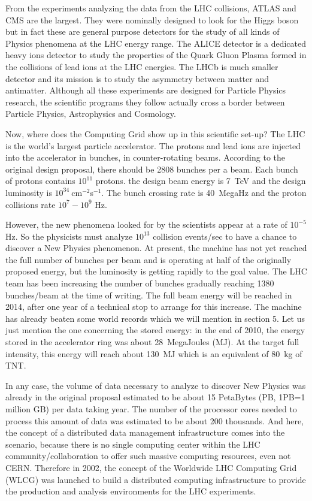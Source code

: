 From the experiments analyzing the data from the LHC
collisions, ATLAS and CMS are the largest. They were nominally
designed to look for the Higgs boson but in fact these are general
purpose detectors for the study of all kinds of Physics phenomena at
the LHC  energy range. The
ALICE  detector is a dedicated heavy ions detector to study the
properties of the Quark Gluon Plasma formed in the collisions of
lead ions  at the LHC energies. The LHCb is much smaller detector and its
mission is to study the asymmetry between matter and antimatter. 
Although all these experiments are
designed for Particle Physics research, the scientific programs they
follow actually cross a border between Particle Physics,
Astrophysics and Cosmology.

Now, where does the Computing Grid show up in this scientific set-up?
The LHC is the world's largest particle accelerator. The protons and
lead ions are injected into the accelerator in bunches, in
counter-rotating beams. According to the original design proposal,
there should be 2808 bunches per a beam. Each bunch of protons
contains $10^{11}$ protons. the design beam energy is 7~TeV and the
design luminosity is $10^{34}\ $cm${}^{-2}$s${}^{-1}$. The bunch
crossing rate is 40~MegaHz and the proton collisions rate
$10^7-10^9$ Hz.

However, the new phenomena looked for by the scientists appear at a
rate of $10^{-5}$ Hz. So the physicists must analyze $10^{13}$
collision events/sec to have a chance to discover a New Physics
phenomenon. At present, the machine has not yet reached the full
number of bunches per beam and is operating at half of the
originally proposed energy, but the luminosity is getting rapidly to
the goal value. The LHC team has been increasing the number of
bunches gradually reaching 1380 bunches/beam at the time of writing.
The full beam energy will be reached in 2014, after one year of a
technical stop to arrange for this increase. The machine has already
beaten some world records which we will mention in section 5. Let us
just mention the one concerning the stored energy: in the end of
2010, the energy stored in the accelerator ring was about 28~MegaJoules (MJ).
At the target full intensity, this energy will
reach about 130~MJ which is an equivalent of 80~kg of TNT.

In any case, the volume of data necessary to analyze to discover New
Physics was already in the original proposal estimated to be about
15 PetaBytes (PB, 1PB=1 million GB) per data taking year. The number 
of the processor cores needed to process this
amount of data was estimated to be about 200 thousands. And here,
the concept of a distributed data management infrastructure comes
into the scenario, because there is no single computing
center within the LHC community/collaboration to offer such  massive
computing resources, even not CERN. Therefore in 2002, the concept
of the Worldwide LHC Computing Grid (WLCG) \cite{WLCG} was launched to
build a distributed computing infrastructure to provide the
production and analysis environments for the LHC experiments.

